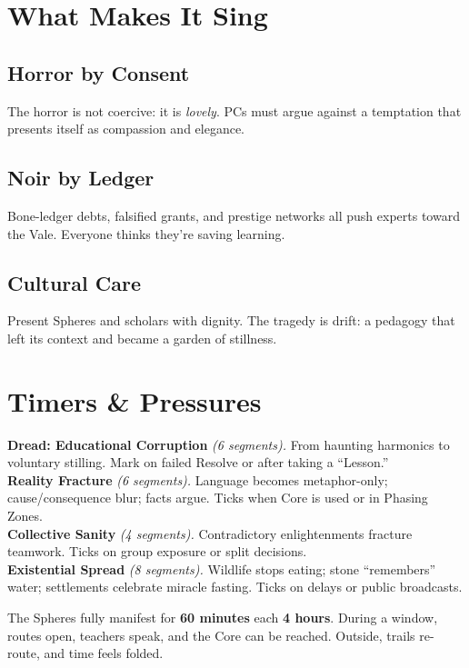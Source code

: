\documentclass[11pt,twoside]{book}
\newcommand{\Mechanic}[2]{%
  \begin{mechanicbox}[frametitle={#1}]
    #2
  \end{mechanicbox}
}
\newcommand{\Clock}[3]{%
  \textbf{#1} \emph{(#2 segments).} #3%
}
\begin{document}
\chapter{What Makes It Sing}

\section*{Horror by Consent}
The horror is not coercive: it is \emph{lovely}. PCs must argue against a temptation that presents itself as compassion and elegance.

\section*{Noir by Ledger}
Bone-ledger debts, falsified grants, and prestige networks all push experts toward the Vale. Everyone thinks they're saving learning.

\section*{Cultural Care}
Present Spheres and scholars with dignity. The tragedy is drift: a pedagogy that left its context and became a garden of stillness.


\chapter{Timers \& Pressures}

\Mechanic{Global Timers}{
\Clock{Dread: Educational Corruption}{6}{From haunting harmonics to voluntary stilling. Mark on failed Resolve or after taking a ``Lesson.''}\\[4pt]
\Clock{Reality Fracture}{6}{Language becomes metaphor-only; cause/consequence blur; facts argue. Ticks when Core is used or in Phasing Zones.}\\[4pt]
\Clock{Collective Sanity}{4}{Contradictory enlightenments fracture teamwork. Ticks on group exposure or split decisions.}\\[4pt]
\Clock{Existential Spread}{8}{Wildlife stops eating; stone ``remembers'' water; settlements celebrate miracle fasting. Ticks on delays or public broadcasts.}
}

\Mechanic{Phasing Windows}{
The Spheres fully manifest for \textbf{60 minutes} each \textbf{4 hours}. During a window, routes open, teachers speak, and the Core can be reached. Outside, trails re-route, and time feels folded.
}
\end{document}
